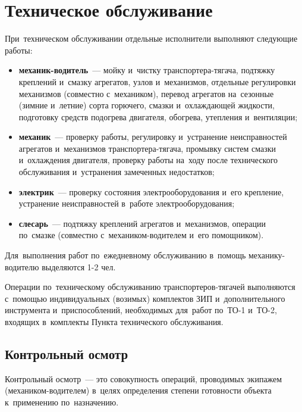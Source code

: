 \chapter{Техническое обслуживание}

При~техническом обслуживании отдельные исполнители выполняют следующие работы:
\begin{itemize}
    \item \textbf{механик-водитель}~--- мойку и~чистку транспортера-тягача, подтяжку креплений и~смазку агрегатов, узлов и~механизмов, отдельные регулировки механизмов (совместно с~механиком), перевод агрегатов на~сезонные (зимние и~летние) сорта горючего, смазки и~охлаждающей жидкости, подготовку средств подогрева двигателя, обогрева, утепления и~вентиляции;
    \item \textbf{механик}~--- проверку работы, регулировку и~устранение неисправностей агрегатов и~механизмов транспортера-тягача, промывку систем смазки и~охлаждения двигателя, проверку работы на~ходу после технического обслуживания и~устранения замеченных недостатков; 
    \item \textbf{электрик}~--- проверку состояния электрооборудования и~его крепление, устранение неисправностей в~работе электрооборудования;  
    \item \textbf{слесарь}~--- подтяжку креплений агрегатов и~механизмов, операции по~смазке (совместно с~механиком-водителем и~его помощником). 
    
\end{itemize}

Для~выполнения работ по~ежедневному обслуживанию в~помощь механику-водителю выделяются 1-2 чел. 

Операции по~техническому обслуживанию транспортеров-тягачей выполняются с~помощью индивидуальных (возимых) комплектов ЗИП и~дополнительного инструмента и~приспособлений, необходимых для~работ по~ТО-1 и~ТО-2, входящих в~комплекты Пункта технического обслуживания.

\section{Контрольный осмотр}

Контрольный осмотр~--- это совокупность операций, проводимых экипажем (механиком-водителем) в~целях определения степени готовности объекта к~применению по~назначению. 

